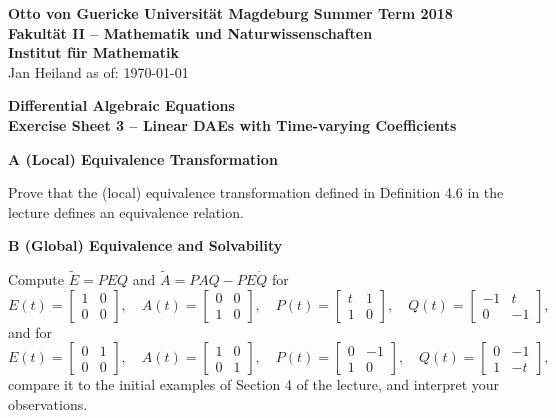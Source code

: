 \documentclass[a4paper,10pt]{article}
\begin{document}
{\bf Otto von Guericke Universit{\"a}t Magdeburg \hfill Summer Term 2018} \\
{\bf Fakult\"at II -- Mathematik und Naturwissenschaften} \\
{\bf Institut f\"ur Mathematik} \\
Jan Heiland \hfill as of: \today \\


\bigskip
\begin{center}
\textbf{\large Differential Algebraic Equations}\\
\smallskip
\textbf{Exercise Sheet 3 -- Linear DAEs with Time-varying Coefficients}\\
\end{center}

\bigskip


{\bf A (Local) Equivalence Transformation}

Prove that the (local) equivalence transformation defined in Definition 4.6 in the lecture defines an equivalence relation.
\smallskip

{\bf B (Global) Equivalence and Solvability}

Compute $\tilde E = PEQ$ and $\tilde A = PAQ - PE\dot Q$ for 
\begin{equation*}
	E(t) = \begin{bmatrix} 1 &0 \\ 0 &0 \end{bmatrix} ,\quad
	A(t) = \begin{bmatrix} 0 &0 \\ 1 &0 \end{bmatrix} ,\quad
	P(t) = \begin{bmatrix} t &1 \\ 1 &0 \end{bmatrix} ,\quad
	Q(t) = \begin{bmatrix} -1 &t \\ 0 &-1 \end{bmatrix} ,
\end{equation*}
and for
\begin{equation*}
	E(t) = \begin{bmatrix} 0 &1 \\ 0 &0 \end{bmatrix} ,\quad
	A(t) = \begin{bmatrix} 1 &0 \\ 0 &1 \end{bmatrix} ,\quad
	P(t) = \begin{bmatrix} 0 &-1 \\ 1 &0 \end{bmatrix} ,\quad
	Q(t) = \begin{bmatrix} 0 &-1 \\ 1 &-t \end{bmatrix} ,
\end{equation*}
compare it to the initial examples of Section 4 of the lecture, and interpret your observations.
\smallskip
\end{document}
